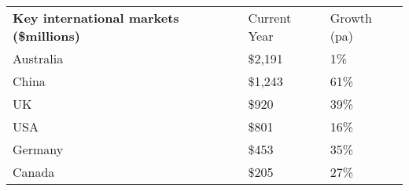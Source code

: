 \begin{tabular}[t]{p{4.85cm}>{\hfill}p{1.3cm}>{\hfill}p{1.35cm}}
 \textbf{Key international markets (\$millions)} & Current Year & Growth (pa) \\ 
 Australia & \$2,191 & 1\% \\ 
  China & \$1,243 & 61\% \\ 
  UK & \$920   & 39\% \\ 
  USA & \$801   & 16\% \\ 
  Germany & \$453   & 35\% \\ 
  Canada & \$205   & 27\% \\ 
  \end{tabular}
